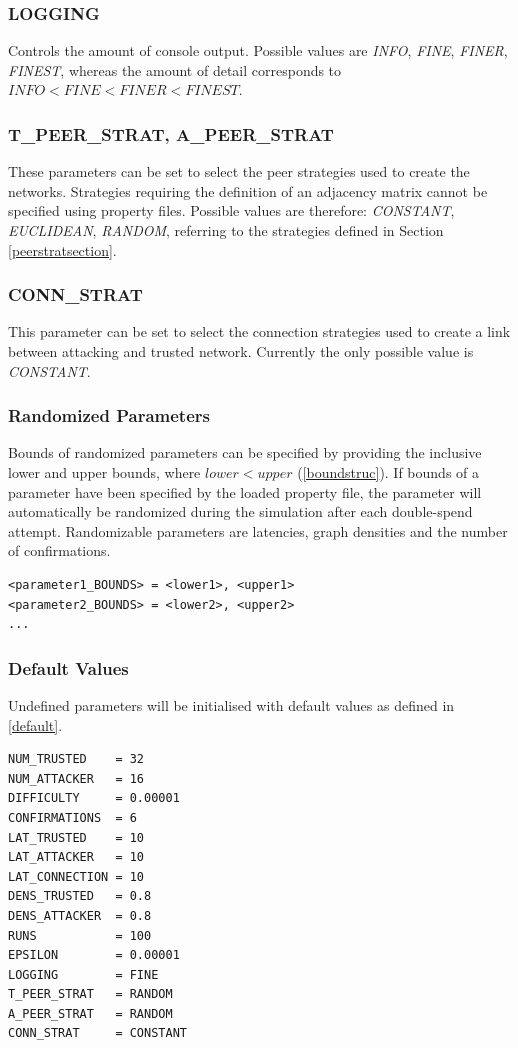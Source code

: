 \documentclass[a4paper,12pt,twoside]{report}
\begin{document}
\subsubsection{LOGGING}
Controls the amount of console output. Possible values are \textit{INFO}, \textit{FINE}, \textit{FINER}, \textit{FINEST}, whereas the amount of detail corresponds to $\textit{INFO} < \textit{FINE} < \textit{FINER} < \textit{FINEST}$.
\subsubsection{T\_PEER\_STRAT, A\_PEER\_STRAT}
These parameters can be set to select the peer strategies used to create the networks. Strategies requiring the definition of an adjacency matrix cannot be specified using property files. Possible values are therefore: \textit{CONSTANT}, \textit{EUCLIDEAN}, \textit{RANDOM}, referring to the strategies defined in Section \ref{peerstratsection}.
\subsubsection{CONN\_STRAT}
This parameter can be set to select the connection strategies used to create a link between attacking and trusted network. Currently the only possible value is \textit{CONSTANT}.
\subsubsection{Randomized Parameters}
Bounds of randomized parameters can be specified by providing the inclusive lower and upper bounds, where $lower < upper$ (\autoref{boundstruc}). If bounds of a parameter have been specified by the loaded property file, the parameter will automatically be randomized during the simulation after each double-spend attempt. Randomizable parameters are latencies, graph densities and the number of confirmations.
\begin{lstlisting}[caption=Defining bounds of randomized parameters,label=boundstruc]
<parameter1_BOUNDS> = <lower1>, <upper1>
<parameter2_BOUNDS> = <lower2>, <upper2>
...
\end{lstlisting}
\subsubsection{Default Values}\label{defaultval}
Undefined parameters will be initialised with default values as defined in \autoref{default}. 
\begin{lstlisting}[caption=Default parameter values,label=default]
NUM_TRUSTED    = 32
NUM_ATTACKER   = 16
DIFFICULTY     = 0.00001
CONFIRMATIONS  = 6
LAT_TRUSTED    = 10
LAT_ATTACKER   = 10
LAT_CONNECTION = 10
DENS_TRUSTED   = 0.8
DENS_ATTACKER  = 0.8
RUNS           = 100
EPSILON        = 0.00001
LOGGING        = FINE
T_PEER_STRAT   = RANDOM
A_PEER_STRAT   = RANDOM
CONN_STRAT     = CONSTANT
\end{lstlisting}
\end{document}
